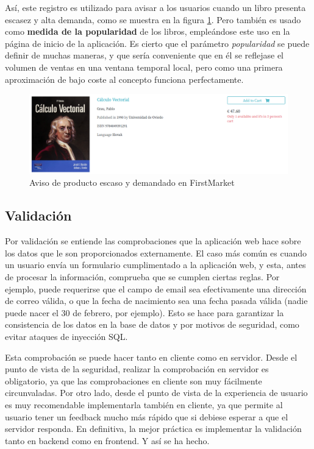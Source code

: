 \documentclass[a4paper]{article}
\begin{document}
    Así, este registro es utilizado para avisar a los usuarios cuando un libro presenta escasez y alta demanda, como se muestra en la figura \ref{fig:fm_cartBookRegistry_alert}. Pero también es usado como \textbf{medida de la popularidad} de los libros, empleándose este uso en la página de inicio de la aplicación. Es cierto que el parámetro \emph{popularidad} se puede definir de muchas maneras, y que sería conveniente que en él se reflejase el volumen de ventas en una ventana temporal local, pero como una primera aproximación de bajo coste al concepto funciona perfectamente.
    
    \begin{figure}[htb!]
    	\centering
    	\includegraphics[width=\textwidth]{fm_cartBookRegistry_alert}
    	\caption{Aviso de producto escaso y demandado en FirstMarket}
    	\label{fig:fm_cartBookRegistry_alert}
    \end{figure}
    
    \subsection{Validación}
    Por validación se entiende las comprobaciones que la aplicación web hace sobre los datos que le son proporcionados externamente. El caso más común es cuando un usuario envía un formulario cumplimentado a la aplicación web, y esta, antes de procesar la información, comprueba que se cumplen ciertas reglas. Por ejemplo, puede requerirse que el campo de email sea efectivamente una dirección de correo válida, o que la fecha de nacimiento sea una fecha pasada válida (nadie puede nacer el 30 de febrero, por ejemplo). Esto se hace para garantizar la consistencia de los datos en la base de datos y por motivos de seguridad, como evitar ataques de inyección SQL.
    
    Esta comprobación se puede hacer tanto en cliente como en servidor. Desde el punto de vista de la seguridad, realizar la comprobación en servidor es obligatorio, ya que las comprobaciones en cliente son muy fácilmente circunvaladas. Por otro lado, desde el punto de vista de la experiencia de usuario es muy recomendable implementarla también en cliente, ya que permite al usuario tener un feedback mucho más rápido que si debiese esperar a que el servidor responda. En definitiva, la mejor práctica es implementar la validación tanto en backend como en frontend. Y así se ha hecho.
    \\
    
\end{document}
